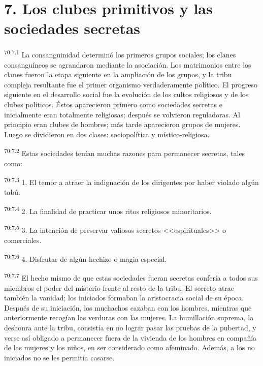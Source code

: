 \section*{7. Los clubes primitivos y las sociedades secretas}
\par
\textsuperscript{70:7.1} La consanguinidad determinó los primeros grupos sociales; los clanes consanguíneos se agrandaron mediante la asociación. Los matrimonios entre los clanes fueron la etapa siguiente en la ampliación de los grupos, y la tribu compleja resultante fue el primer organismo verdaderamente político. El progreso siguiente en el desarrollo social fue la evolución de los cultos religiosos y de los clubes políticos. Éstos aparecieron primero como sociedades secretas e inicialmente eran totalmente religiosas; después se volvieron reguladoras. Al principio eran clubes de hombres; más tarde aparecieron grupos de mujeres. Luego se dividieron en dos clases: sociopolítica y místico-religiosa.

\par
\textsuperscript{70:7.2} Estas sociedades tenían muchas razones para permanecer secretas, tales como:

\par
\textsuperscript{70:7.3} 1. El temor a atraer la indignación de los dirigentes por haber violado algún tabú.

\par
\textsuperscript{70:7.4} 2. La finalidad de practicar unos ritos religiosos minoritarios.

\par
\textsuperscript{70:7.5} 3. La intención de preservar valiosos secretos <<espirituales>> o comerciales.

\par
\textsuperscript{70:7.6} 4. Disfrutar de algún hechizo o magia especial.

\par
\textsuperscript{70:7.7} El hecho mismo de que estas sociedades fueran secretas confería a todos sus miembros el poder del misterio frente al resto de la tribu. El secreto atrae también la vanidad; los iniciados formaban la aristocracia social de su época. Después de su iniciación, los muchachos cazaban con los hombres, mientras que anteriormente recogían las verduras con las mujeres. La humillación suprema, la deshonra ante la tribu, consistía en no lograr pasar las pruebas de la pubertad, y verse así obligado a permanecer fuera de la vivienda de los hombres en compañía de las mujeres y los niños, en ser considerado como afeminado. Además, a los no iniciados no se les permitía casarse.

